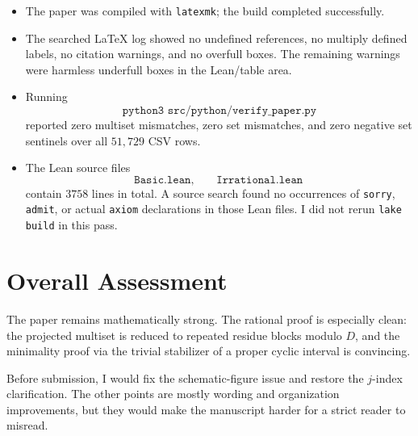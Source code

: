 \documentclass[11pt]{article}
\begin{document}
\begin{itemize}[leftmargin=*]
  \item The paper was compiled with \texttt{latexmk}; the build completed
  successfully.
  \item The searched LaTeX log showed no undefined references, no multiply
  defined labels, no citation warnings, and no overfull boxes.  The remaining
  warnings were harmless underfull boxes in the Lean/table area.
  \item Running
  \[
  \texttt{python3 src/python/verify\_paper.py}
  \]
  reported zero multiset mismatches, zero set mismatches, and zero negative
  set sentinels over all \(51{,}729\) CSV rows.
  \item The Lean source files
  \[
  \texttt{Basic.lean},\qquad \texttt{Irrational.lean}
  \]
  contain \(3758\) lines in total.  A source search found no occurrences of
  \texttt{sorry}, \texttt{admit}, or actual \texttt{axiom} declarations in
  those Lean files.  I did not rerun \texttt{lake build} in this pass.
\end{itemize}

\section*{Overall Assessment}

The paper remains mathematically strong.  The rational proof is especially
clean: the projected multiset is reduced to repeated residue blocks modulo
\(D\), and the minimality proof via the trivial stabilizer of a proper cyclic
interval is convincing.

Before submission, I would fix the schematic-figure issue and restore the
\(j\)-index clarification.  The other points are mostly wording and
organization improvements, but they would make the manuscript harder for a
strict reader to misread.
\end{document}
